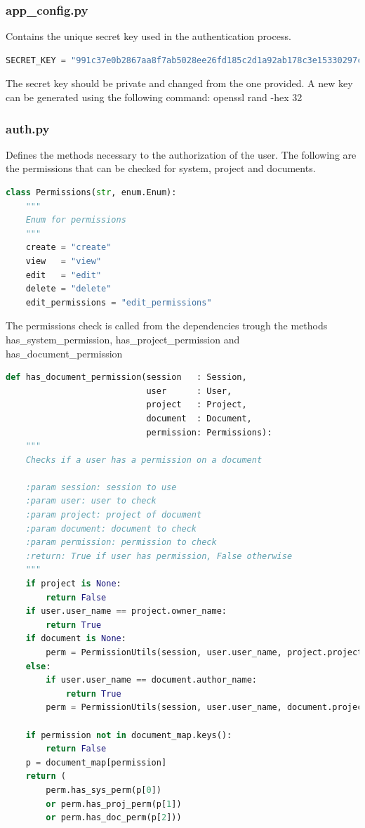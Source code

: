 \documentclass[12pt]{report}
\begin{document}
\subsubsection{app\_config.py}
Contains the unique secret key used in the authentication process.
\begin{lstlisting}[language=Python, caption=Secret key]
SECRET_KEY = "991c37e0b2867aa8f7ab5028ee26fd185c2d1a92ab178c3e15330297c8931e2f"
\end{lstlisting}
The secret key should be private and changed from the one provided.
A new key can be generated using the following command: openssl rand -hex 32

\subsubsection{auth.py}
Defines the methods necessary to the authorization of the user.
The following are the permissions that can be checked for system, project and documents.

\begin{lstlisting}[language=Python, caption=Permissions]
class Permissions(str, enum.Enum):
    """
    Enum for permissions
    """
    create = "create"
    view   = "view"
    edit   = "edit"
    delete = "delete"
    edit_permissions = "edit_permissions"
\end{lstlisting}
The permissions check is called from the dependencies trough the methods has\_system\_permission, has\_project\_permission and has\_document\_permission

\begin{lstlisting}[language=Python, caption=Check if user has permission on document]
def has_document_permission(session   : Session, 
                            user      : User, 
                            project   : Project, 
                            document  : Document, 
                            permission: Permissions):
    """
    Checks if a user has a permission on a document

    :param session: session to use
    :param user: user to check
    :param project: project of document
    :param document: document to check
    :param permission: permission to check
    :return: True if user has permission, False otherwise
    """
    if project is None:
        return False
    if user.user_name == project.owner_name:
        return True
    if document is None:
        perm = PermissionUtils(session, user.user_name, project.project_name)
    else:
        if user.user_name == document.author_name:
            return True
        perm = PermissionUtils(session, user.user_name, document.project_name, document.document_name)

    if permission not in document_map.keys():
        return False
    p = document_map[permission]
    return (
        perm.has_sys_perm(p[0])
        or perm.has_proj_perm(p[1])
        or perm.has_doc_perm(p[2]))
\end{lstlisting}
\end{document}
